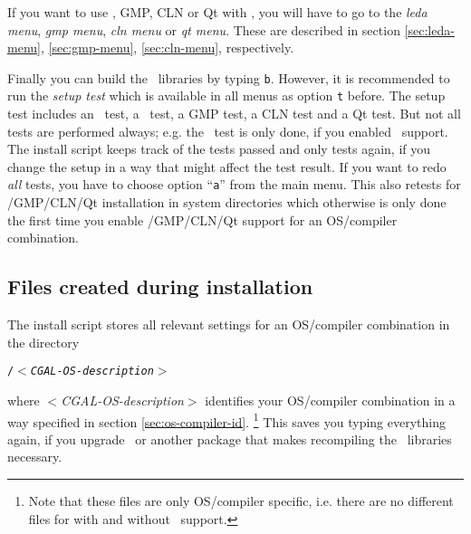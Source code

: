 If you want to use \leda, GMP, CLN or Qt with \cgal, you will have to go
to the \textit{leda menu}, \textit{gmp menu}, \textit{cln menu} or
\textit{qt menu}.
These are described in section \ref{sec:leda-menu},
\ref{sec:gmp-menu}, \ref{sec:cln-menu}, respectively.

Finally you can build the \cgal\ libraries by typing \texttt{b}.
However, it is recommended to run the \textit{setup test} which is
available in all menus as option \texttt{t} before. The setup test
includes an \stl\ test, a \leda\ test, a GMP test, a CLN test and a Qt
test. But
not all tests are performed always; e.g. the \leda\ test is only done,
if you enabled \leda\ support. The install script keeps track of the
tests passed and only tests again, if you change the setup in a way
that might affect the test result. If you want to redo \textit{all}
tests, you have to choose option ``\texttt{a}'' from the main menu.
This also retests for \leda/GMP/CLN/Qt installation in system directories
which otherwise is only done the first time you enable \leda/GMP/CLN/Qt
support for an OS/compiler combination.

\subsection{Files created during installation}\label{sec:filescreated}

The install script stores all relevant settings for an OS/compiler
combination in the directory
\begin{center}
  \texttt{\cgalinstconfdir/$<$\textit{CGAL-OS-description}$>$}
\end{center}
where $<$\textit{CGAL-OS-description}$>$ identifies your OS/compiler
combination in a way specified in section \ref{sec:os-compiler-id}.
\footnote{Note that these files are only OS/compiler specific, i.e.
  there are no different files for with and without \leda\ support.}
This saves you typing everything again, if you upgrade
 \cgal\ or another
package that makes recompiling the \cgal\ libraries necessary.

